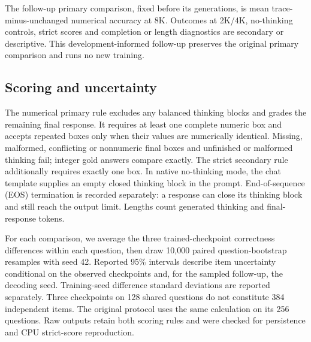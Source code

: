The follow-up primary comparison, fixed before its generations, is mean trace-minus-unchanged numerical accuracy at 8K. Outcomes at 2K/4K, no-thinking controls, strict scores and completion or length diagnostics are secondary or descriptive. This development-informed follow-up preserves the original primary comparison and runs no new training.

\subsection{Scoring and uncertainty}
The numerical primary rule excludes any balanced thinking blocks and grades the remaining final response. It requires at least one complete numeric box and accepts repeated boxes only when their values are numerically identical. Missing, malformed, conflicting or nonnumeric final boxes and unfinished or malformed thinking fail; integer gold answers compare exactly. The strict secondary rule additionally requires exactly one box. In native no-thinking mode, the chat template supplies an empty closed thinking block in the prompt. End-of-sequence (EOS) termination is recorded separately: a response can close its thinking block and still reach the output limit. Lengths count generated thinking and final-response tokens.

For each comparison, we average the three trained-checkpoint correctness differences within each question, then draw 10,000 paired question-bootstrap resamples with seed 42. Reported 95\% intervals describe item uncertainty conditional on the observed checkpoints and, for the sampled follow-up, the decoding seed. Training-seed difference standard deviations are reported separately. Three checkpoints on 128 shared questions do not constitute 384 independent items. The original protocol uses the same calculation on its 256 questions. Raw outputs retain both scoring rules and were checked for persistence and CPU strict-score reproduction.
